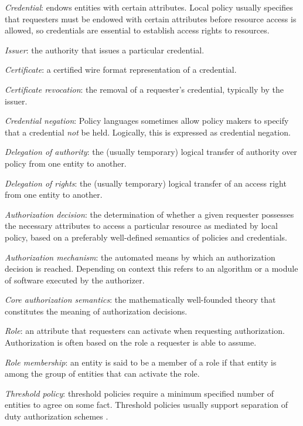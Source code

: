 \medskip\emph{Credential}: endows entities with certain attributes.
Local policy usually specifies that requesters must be endowed with
certain attributes before resource access is allowed, so credentials
are essential to establish access rights to resources.

\medskip\emph{Issuer}: the authority that issues a particular credential.

\medskip\emph{Certificate}: a certified wire format representation of
a credential.
%

\medskip\emph{Certificate revocation}: the removal of a requester's 
credential, typically by the issuer.

\medskip\emph{Credential negation}: Policy languages sometimes 
allow policy makers to specify that a credential \emph{not} be held.
Logically, this is expressed as credential negation.

\medskip\emph{Delegation of authority}: the (usually temporary) logical 
transfer of authority over policy from one entity to another.

\medskip\emph{Delegation of rights}: the (usually temporary) logical
transfer of an access right from one entity to another.

\medskip\emph{Authorization decision}: the determination of whether a
given requester possesses the necessary attributes to access a
particular resource as mediated by local policy, based on a preferably
well-defined semantics of policies and credentials.
%

\medskip\emph{Authorization mechanism}: the automated means by which
an authorization decision is reached. Depending on context this refers
to an algorithm or a module of software executed by the authorizer.

\medskip\emph{Core authorization semantics}: the mathematically
well-founded theory that constitutes the meaning of authorization
decisions.  

\medskip\emph{Role}: an attribute that requesters can activate when
requesting authorization.  Authorization is often based on the role
a requester is able to assume.

\medskip\emph{Role membership}: an entity is said to be a member of a role
if that entity is among the group of entities that can activate the role.

\medskip\emph{Threshold policy}: threshold policies require a 
minimum specified number of entities to agree on some fact. 
Threshold policies usually support separation of duty authorization
schemes \cite{Li:DRBTMF}. 

